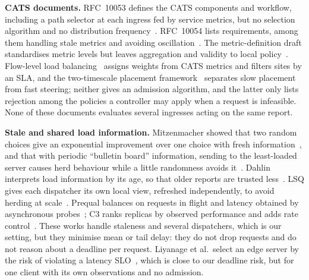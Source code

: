 \documentclass[conference]{IEEEtran}
\begin{document}
\textbf{CATS documents.} RFC~10053 defines the CATS components and workflow, including a path selector at each ingress fed by service metrics, but no selection algorithm and no distribution frequency~\cite{rfc10053}. RFC~10054 lists requirements, among them handling stale metrics and avoiding oscillation~\cite{rfc10054}. The metric-definition draft standardises metric levels but leaves aggregation and validity to local policy~\cite{catsmetrics}. Flow-level load balancing~\cite{flowlb} assigns weights from CATS metrics and filters sites by an SLA, and the two-timescale placement framework~\cite{catpts} separates slow placement from fast steering; neither gives an admission algorithm, and the latter only lists rejection among the policies a controller may apply when a request is infeasible. None of these documents evaluates several ingresses acting on the same report.

\textbf{Stale and shared load information.} Mitzenmacher showed that two random choices give an exponential improvement over one choice with fresh information~\cite{mitz2001two}, and that with periodic ``bulletin board'' information, sending to the least-loaded server causes herd behaviour while a little randomness avoids it~\cite{mitz2000old}. Dahlin interprets load information by its age, so that older reports are trusted less~\cite{dahlin}. LSQ gives each dispatcher its own local view, refreshed independently, to avoid herding at scale~\cite{lsq}. Prequal balances on requests in flight and latency obtained by asynchronous probes~\cite{prequal}; C3 ranks replicas by observed performance and adds rate control~\cite{c3}. These works handle staleness and several dispatchers, which is our setting, but they minimise mean or tail delay: they do not drop requests and do not reason about a deadline per request. Liyanage et al.\ select an edge server by the risk of violating a latency SLO~\cite{liyanage}, which is close to our deadline risk, but for one client with its own observations and no admission.
\end{document}
